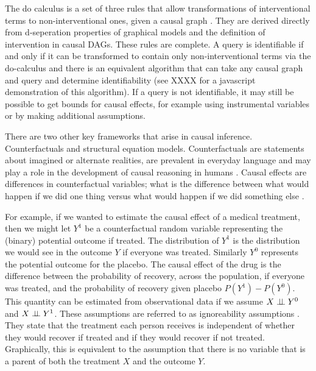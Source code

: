 \documentclass[11pt,a4paper]{article}
\begin{document}
The do calculus is a set of three rules that allow transformations of interventional terms to non-interventional ones, given a causal graph \cite{Pearl2000}. They are derived directly from d-seperation properties of graphical models and the definition of intervention in causal DAGs. These rules are complete. A query is identifiable if and only if it can be transformed to contain only non-interventional terms via the do-calculus \cite{Shpitser2006,Huang2006} and there is an equivalent algorithm that can take any causal graph and query and determine identifiability \cite {Shpitser2008} (see XXXX for a javascript demonstration of this algorithm). If a query is not identifiable, it may still be possible to get bounds for causal effects, for example using instrumental variables \cite{Angrist2009} or by making additional assumptions. 

There are two other key frameworks that arise in causal inference. Counterfactuals and structural equation models.  Counterfactuals are statements about imagined or alternate realities, are prevalent in everyday language and may play a role in the development of causal reasoning in humans \cite{Weisberg2013}. Causal effects are differences in counterfactual variables; what is the difference between what would happen if we did one thing versus what would happen if we did something else \cite{Rubin1974,Rubin1978,Rosenbaum1983, Rubin2005,Rubin2008}. 

For example, if we wanted to estimate the causal effect of a medical treatment, then we might let $Y^{1}$ be a counterfactual random variable representing the (binary) potential outcome if treated. The distribution of $Y^{1}$ is the distribution we would see in the outcome $Y$ if everyone was treated. Similarly $Y^{0}$ represents the potential outcome for the placebo. The causal effect of the drug is the difference between the probability of recovery, across the population, if everyone was treated, and the probability of recovery given placebo $P(Y^{1})-P(Y^{0})$. This quantity can be estimated from observational data if we assume $X \perp\!\!\!\perp Y^{0}$ and $X \perp\!\!\!\perp Y^{1}$. These assumptions are referred to as ignoreability assumptions \cite{Rosenbaum1983}. They state that the treatment each person receives is independent of whether they would recover if treated and if they would recover if not treated. Graphically, this is equivalent to the assumption that there is no variable that is a parent of both the treatment $X$ and the outcome $Y$. 
\end{document}
